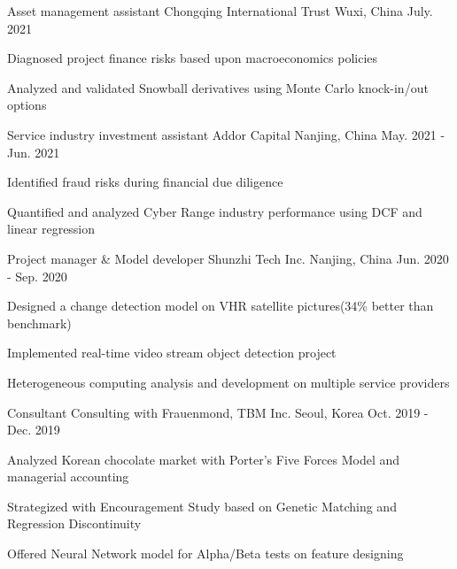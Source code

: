 \begin{cventries}
  \cventry
    {Asset management assistant}
    {Chongqing International Trust}
    {Wuxi, China}
    {July. 2021}
    {
      \begin{cvitems}
        \item {Diagnosed project finance risks based upon macroeconomics policies}
        \item {Analyzed and validated Snowball derivatives using Monte Carlo knock-in/out options}
      \end{cvitems}
    }

  \cventry
    {Service industry investment assistant}
    {Addor Capital}
    {Nanjing, China}
    {May. 2021 - Jun. 2021}
    {
      \begin{cvitems}
        \item {Identified fraud risks during financial due diligence}
        \item {Quantified and analyzed Cyber Range industry performance using DCF and linear regression}
      \end{cvitems}
    }

  \cventry
    {Project manager \& Model developer}
    {Shunzhi Tech Inc.}
    {Nanjing, China}
    {Jun. 2020 - Sep. 2020}
    {
      \begin{cvitems}
        \item {Designed a change detection model on VHR satellite pictures(34\% better than benchmark)}
        \item {Implemented real-time video stream object detection project}
        \item {Heterogeneous computing analysis and development on multiple service providers}
      \end{cvitems}
    }

  \cventry
    {Consultant}
    {Consulting with Frauenmond, TBM Inc.}
    {Seoul, Korea}
    {Oct. 2019 - Dec. 2019}
    {
      \begin{cvitems}
        \item {Analyzed Korean chocolate market with Porter's Five Forces Model and managerial accounting}
        \item {Strategized with Encouragement Study based on Genetic Matching and Regression Discontinuity}
        \item {Offered Neural Network model for Alpha/Beta tests on feature designing}
      \end{cvitems}
    }


\end{cventries}
